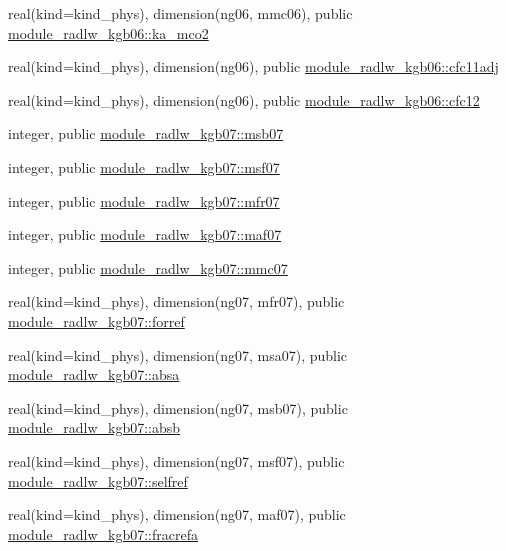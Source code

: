 \begin{DoxyCompactItemize}
\item 
real(kind=kind\+\_\+phys), dimension(ng06, mmc06), public \hyperlink{group__module__radlw__main_gadb5dab732383b82e89f1048ab5150c23}{module\+\_\+radlw\+\_\+kgb06\+::ka\+\_\+mco2}
\item 
real(kind=kind\+\_\+phys), dimension(ng06), public \hyperlink{group__module__radlw__main_ga8b0813723ba69b1afbe2552f6b730267}{module\+\_\+radlw\+\_\+kgb06\+::cfc11adj}
\item 
real(kind=kind\+\_\+phys), dimension(ng06), public \hyperlink{group__module__radlw__main_ga44f5934520edc537b5df004774b0ef71}{module\+\_\+radlw\+\_\+kgb06\+::cfc12}
\item 
integer, public \hyperlink{group__module__radlw__main_gabba2139dfc5d8551f844f3809c28ce3c}{module\+\_\+radlw\+\_\+kgb07\+::msb07}
\item 
integer, public \hyperlink{group__module__radlw__main_ga9310f33501467fbadcf092d71559358b}{module\+\_\+radlw\+\_\+kgb07\+::msf07}
\item 
integer, public \hyperlink{group__module__radlw__main_ga0bd5d550553238ae13cbf57423d102c8}{module\+\_\+radlw\+\_\+kgb07\+::mfr07}
\item 
integer, public \hyperlink{group__module__radlw__main_ga21ac454fe21fb07ee555b4106121b2ae}{module\+\_\+radlw\+\_\+kgb07\+::maf07}
\item 
integer, public \hyperlink{group__module__radlw__main_ga2d176bec938d9fdcc2369fda91308702}{module\+\_\+radlw\+\_\+kgb07\+::mmc07}
\item 
real(kind=kind\+\_\+phys), dimension(ng07, mfr07), public \hyperlink{group__module__radlw__main_ga43ceef4cb2707a2874c2d59e93ba9791}{module\+\_\+radlw\+\_\+kgb07\+::forref}
\item 
real(kind=kind\+\_\+phys), dimension(ng07, msa07), public \hyperlink{group__module__radlw__main_gaf106cf054f7496a092ceb0c399753a36}{module\+\_\+radlw\+\_\+kgb07\+::absa}
\item 
real(kind=kind\+\_\+phys), dimension(ng07, msb07), public \hyperlink{group__module__radlw__main_gab0478438e9bbe64401aa492510f8d4bb}{module\+\_\+radlw\+\_\+kgb07\+::absb}
\item 
real(kind=kind\+\_\+phys), dimension(ng07, msf07), public \hyperlink{group__module__radlw__main_gaaf6d41f390a0465af92756b9c3e6c558}{module\+\_\+radlw\+\_\+kgb07\+::selfref}
\item 
real(kind=kind\+\_\+phys), dimension(ng07, maf07), public \hyperlink{group__module__radlw__main_ga07f2a4a0f1152a65aed68623f14a9ae4}{module\+\_\+radlw\+\_\+kgb07\+::fracrefa}

\end{DoxyCompactItemize}
